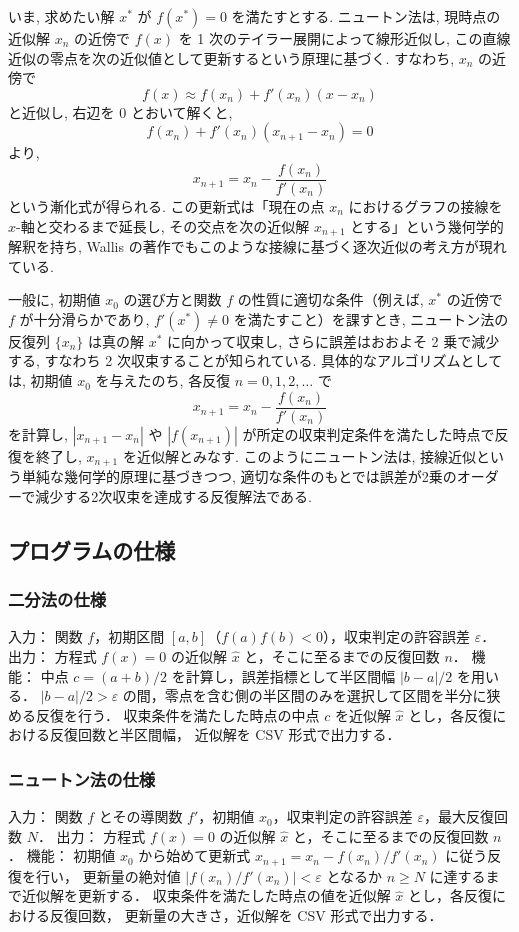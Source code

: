 \documentclass[a4paper,fontsize=11pt,line_length=40zw,number_of_lines=35,baselineskip=1.7zw]{jlreq}
\begin{document}
いま, 求めたい解 $x^*$ が $f(x^*)=0$ を満たすとする. ニュートン法は, 
現時点の近似解 $x_n$ の近傍で $f(x)$ を 1 次のテイラー展開によって線形近似し, 
この直線近似の零点を次の近似値として更新するという原理に基づく. 
すなわち, $x_n$ の近傍で
$$f(x) \approx f(x_n) + f'(x_n)(x-x_n)$$
と近似し, 右辺を 0 とおいて解くと, 
$$f(x_n) + f'(x_n)(x_{n+1}-x_n) = 0$$
より, 
$$x_{n+1} = x_n - \frac{f(x_n)}{f'(x_n)}$$
という漸化式が得られる. 
この更新式は「現在の点 $x_n$ におけるグラフの接線を $x$-軸と交わるまで延長し, 
その交点を次の近似解 $x_{n+1}$ とする」という幾何学的解釈を持ち, 
Wallis の著作でもこのような接線に基づく逐次近似の考え方が現れている.\cite{wallisTreatiseAlgebra1685}

一般に, 初期値 $x_0$ の選び方と関数 $f$ の性質に適切な条件（例えば, 
$x^*$ の近傍で $f$ が十分滑らかであり, $f'(x^*)\neq 0$ を満たすこと）を課すとき, 
ニュートン法の反復列 $\{x_n\}$ は真の解 $x^*$ に向かって収束し, 
さらに誤差はおおよそ 2 乗で減少する, すなわち 2 次収束することが知られている. 
具体的なアルゴリズムとしては, 初期値 $x_0$ を与えたのち, 
各反復 $n=0,1,2,\dots$ で
$$x_{n+1} = x_n - \frac{f(x_n)}{f'(x_n)}$$
を計算し, $|x_{n+1}-x_n|$ や $|f(x_{n+1})|$ が所定の収束判定条件を満たした時点で反復を終了し, $x_{n+1}$ を近似解とみなす. 
このようにニュートン法は, 接線近似という単純な幾何学的原理に基づきつつ, 
適切な条件のもとでは誤差が2乗のオーダーで減少する2次収束を達成する反復解法である. 

\subsection{プログラムの仕様}
\subsubsection{二分法の仕様}
入力： 関数 $f$，初期区間 $[a,b]$（$f(a)f(b)<0$），収束判定の許容誤差 $\varepsilon$．
出力： 方程式 $f(x)=0$ の近似解 $\hat{x}$ と，そこに至るまでの反復回数 $n$．
機能： 中点 $c=(a+b)/2$ を計算し，誤差指標として半区間幅 $|b-a|/2$ を用いる．
  $|b-a|/2>\varepsilon$ の間，零点を含む側の半区間のみを選択して区間を半分に狭める反復を行う．
  収束条件を満たした時点の中点 $c$ を近似解 $\hat{x}$ とし，各反復における反復回数と半区間幅，
  近似解を CSV 形式で出力する．

\subsubsection{ニュートン法の仕様}
入力： 関数 $f$ とその導関数 $f'$，初期値 $x_0$，収束判定の許容誤差 $\varepsilon$，最大反復回数 $N$．
出力： 方程式 $f(x)=0$ の近似解 $\hat{x}$ と，そこに至るまでの反復回数 $n$．
機能： 初期値 $x_0$ から始めて更新式 $x_{n+1}=x_n-f(x_n)/f'(x_n)$ に従う反復を行い，
  更新量の絶対値 $|f(x_n)/f'(x_n)|<\varepsilon$ となるか $n\ge N$ に達するまで近似解を更新する．
  収束条件を満たした時点の値を近似解 $\hat{x}$ とし，各反復における反復回数，
  更新量の大きさ，近似解を CSV 形式で出力する．
\end{document}
